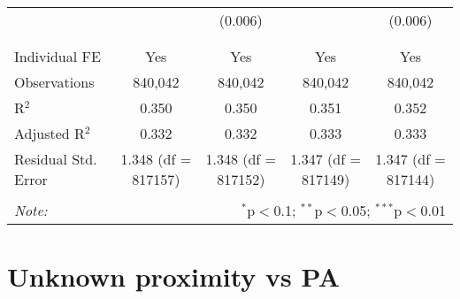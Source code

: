 \documentclass[
]{article}
\begin{document}
\begin{table}[!htbp]
{\begin{tabular}{@{\extracolsep{5pt}}lcccc}
  &  & (0.006) &  & (0.006) \\ 
  & & & & \\ 
\hline \\[-1.8ex] 
Individual FE & Yes & Yes & Yes & Yes \\ 
Observations & 840,042 & 840,042 & 840,042 & 840,042 \\ 
R$^{2}$ & 0.350 & 0.350 & 0.351 & 0.352 \\ 
Adjusted R$^{2}$ & 0.332 & 0.332 & 0.333 & 0.333 \\ 
Residual Std. Error & 1.348 (df = 817157) & 1.348 (df = 817152) & 1.347 (df = 817149) & 1.347 (df = 817144) \\ 
\hline 
\hline \\[-1.8ex] 
\textit{Note:}  & \multicolumn{4}{r}{$^{*}$p$<$0.1; $^{**}$p$<$0.05; $^{***}$p$<$0.01} \\ 
\end{tabular}
} 
\end{table} 
\newpage
\section{Unknown proximity vs PA}
\end{document}
